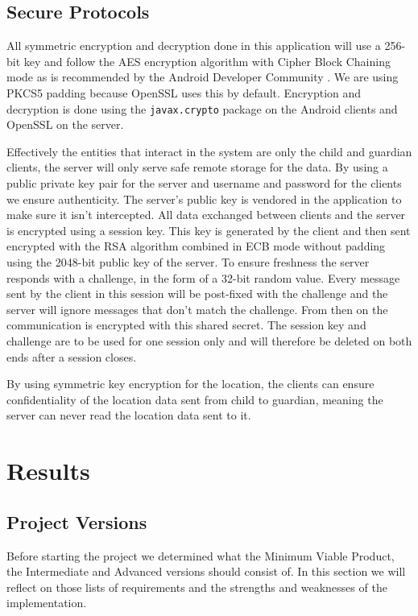 \documentclass[a4paper]{article}
\begin{document}
\subsection{Secure Protocols}
All symmetric encryption and decryption done in this application will use a 256-bit key and follow the AES encryption algorithm with Cipher Block Chaining mode as is recommended by the Android Developer Community \cite{cipher_recommendation}. We are using PKCS5 padding because OpenSSL \cite{openssl} uses this by default. Encryption and decryption is done using the \texttt{javax.crypto} package on the Android clients and OpenSSL on the server.

Effectively the entities that interact in the system are only the child and guardian clients, the server will only serve safe remote storage for the data. By using a public private key pair for the server and username and password for the clients we ensure authenticity. The server's public key is vendored in the application to make sure it isn't intercepted. All data exchanged between clients and the server is encrypted using a session key. This key is generated by the client and then sent encrypted with the RSA algorithm combined in ECB mode without padding using the 2048-bit public key of the server. To ensure freshness the server responds with a challenge, in the form of a 32-bit random value. Every message sent by the client in this session will be post-fixed with the challenge and the server will ignore messages that don't match the challenge. From then on the communication is encrypted with this shared secret. The session key and challenge are to be used for one session only and will therefore be deleted on both ends after a session closes.

By using symmetric key encryption for the location, the clients can ensure confidentiality of the location data sent from child to guardian, meaning the server can never read the location data sent to it.

\section{Results}
\subsection{Project Versions}
Before starting the project we determined what the Minimum Viable Product, the Intermediate and Advanced versions should consist of. In this section we will reflect on those lists of requirements and the strengths and weaknesses of the implementation.
\end{document}
